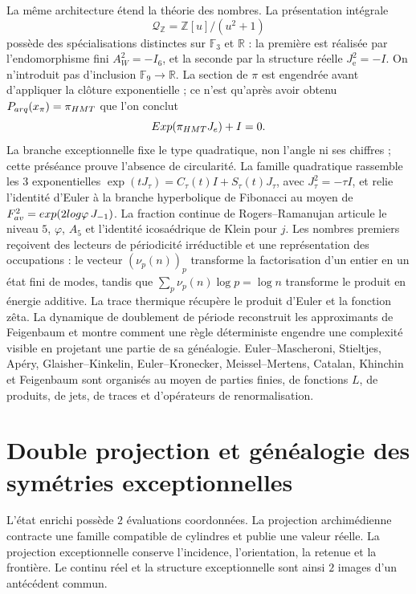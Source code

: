 La même architecture étend la théorie des nombres. La présentation intégrale
\[
 \mathcal Q_{\mathbb Z}=\mathbb Z[u]/(u^2+1)
\]
possède des spécialisations distinctes sur \(\mathbb F_3\) et \(\mathbb R\) :
la première est réalisée par l'endomorphisme fini
\(A_W^2=-I_6\), et la seconde par la structure réelle
\(J_{\mathrm e}^2=-I\). On n'introduit pas d'inclusion
\(\mathbb F_9\to\mathbb R\). La section de \(\pi\) est engendrée avant
d'appliquer la clôture exponentielle ; ce n'est qu'après avoir obtenu
\(\mathcal P_{\rm arq}(x_\pi)=\pi_{\rm HMT}\) que l'on conclut
\[
 \operatorname{Exp}(\pi_{\rm HMT}J_{\mathrm e})+I=0.
\]
La branche exceptionnelle fixe le type quadratique, non l'angle ni ses chiffres ; cette
préséance prouve l'absence de circularité.
La famille quadratique rassemble les \(3\) exponentielles
\(\exp(tJ_\tau)=C_\tau(t)I+S_\tau(t)J_\tau\), avec
\(J_\tau^2=-\tau I\), et relie l'identité d'Euler à la branche hyperbolique
de Fibonacci au moyen de
\(F_{\rm av}^{2}=\exp(2\log\varphi\,J_{-1})\). La fraction continue de
Rogers--Ramanujan articule le niveau \(5\),
\(\varphi\), \(A_5\) et l'identité icosaédrique de Klein pour \(j\). Les
nombres premiers reçoivent des lecteurs de périodicité irréductible et une représentation des
occupations : le vecteur \((\nu_p(n))_p\) transforme la factorisation d'un
entier en un état fini de modes, tandis que
\(\sum_p\nu_p(n)\log p=\log n\) transforme le produit en énergie additive.
La trace thermique récupère le produit d'Euler et la fonction zêta. La dynamique
de doublement de période reconstruit les approximants de Feigenbaum et montre
comment une règle déterministe engendre une complexité visible en projetant une partie de
sa généalogie. Euler--Mascheroni,
Stieltjes, Apéry, Glaisher--Kinkelin, Euler--Kronecker, Meissel--Mertens,
Catalan, Khinchin et Feigenbaum sont organisés au moyen de parties finies,
de fonctions \(L\), de produits, de jets, de traces et d'opérateurs de renormalisation.

\section*{Double projection et généalogie des symétries exceptionnelles}

L'état enrichi possède \(2\) évaluations coordonnées. La projection
archimédienne contracte une famille compatible de cylindres et publie une valeur
réelle. La projection exceptionnelle conserve l'incidence, l'orientation, la
retenue et la frontière. Le continu réel et la structure exceptionnelle sont ainsi
\(2\) images d'un antécédent commun.

